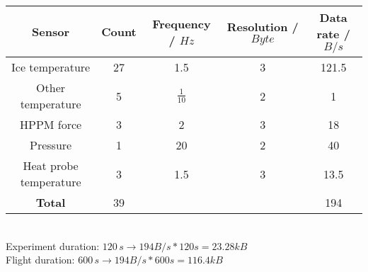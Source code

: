 \documentclass[12pt, a4paper]{scrreprt}
\begin{document}
\begin{tabular}{|c|c|c|c|c|}
	\hline 
	Sensor & Count & Frequency / $Hz$ & Resolution / $Byte$ & Data rate / $B/s$ \\ 
	\hline 
	Ice temperature & 27 & 1.5 & 3 & 121.5 \\ 
	\hline 
	Other temperature & 5 & $\frac{1}{10}$ & 2 & 1 \\ 
	\hline 
	HPPM force & 3 & 2 & 3 & 18 \\ 
	\hline 
	Pressure & 1 & 20 & 2 & 40 \\ 
	\hline 
	Heat probe temperature & 3 & 1.5 & 3 & 13.5 \\ 
	\hline 
	\textbf{Total} & 39 & & & 194 \\ 
	\hline 
\end{tabular} 
\\[0.5em]
Experiment duration: $120\,s \rightarrow 194B/s * 120s = 23.28kB$
\\[0.5em]
Flight duration: $600\,s \rightarrow 194B/s * 600s = 116.4kB$
\end{document}
